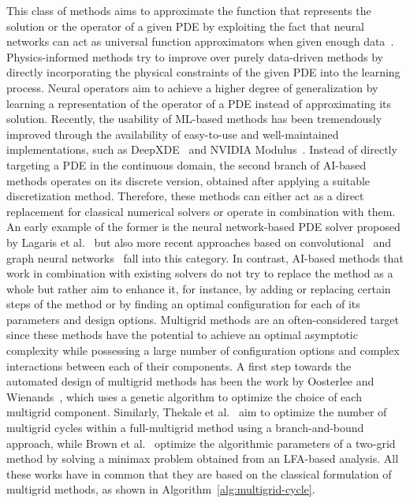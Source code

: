 This class of methods aims to approximate the function that represents the solution or the operator of a given PDE by exploiting the fact that neural networks can act as universal function approximators when given enough data~\cite{hornik1989multilayer}.
Physics-informed methods try to improve over purely data-driven methods by directly incorporating the physical constraints of the given PDE into the learning process.
Neural operators aim to achieve a higher degree of generalization by learning a representation of the operator of a PDE instead of approximating its solution.
Recently, the usability of ML-based methods has been tremendously improved through the availability of easy-to-use and well-maintained implementations, such as DeepXDE~\cite{lu2021deepxde} and NVIDIA Modulus~\cite{hennigh2021nvidia}. 
Instead of directly targeting a PDE in the continuous domain, the second branch of AI-based methods operates on its discrete version, obtained after applying a suitable discretization method.
Therefore, these methods can either act as a direct replacement for classical numerical solvers or operate in combination with them.
An early example of the former is the neural network-based PDE solver proposed by Lagaris et al.~\cite{lagaris1998artificial} but also more recent approaches based on convolutional~\cite{thuerey2020deep} and graph neural networks~\cite{pfaff2020learning} fall into this category.
In contrast, AI-based methods that work in combination with existing solvers do not try to replace the method as a whole but rather aim to enhance it, for instance, by adding or replacing certain steps of the method or by finding an optimal configuration for each of its parameters and design options.
Multigrid methods are an often-considered target since these methods have the potential to achieve an optimal asymptotic complexity while possessing a large number of configuration options and complex interactions between each of their components.
A first step towards the automated design of multigrid methods has been the work by Oosterlee and Wienands~\cite{oosterlee2003genetic}, which uses a genetic algorithm to optimize the choice of each multigrid component.
Similarly, Thekale et al.~\cite{thekale2010optimizing} aim to optimize the number of multigrid cycles within a full-multigrid method using a branch-and-bound approach, while Brown et al.~\cite{brown2021tuning} optimize the algorithmic parameters of a two-grid method by solving a minimax problem obtained from an LFA-based analysis.
All these works have in common that they are based on the classical formulation of multigrid methods, as shown in Algorithm~\ref{alg:multigrid-cycle}.
